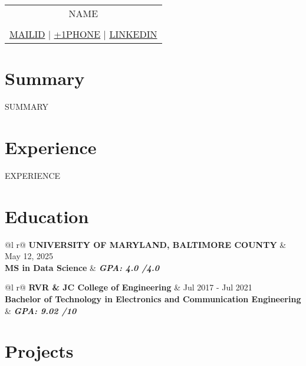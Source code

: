 \documentclass[a4paper,3pt]{article}
\begin{document}
\pagestyle{empty} 


\begin{tabularx}{\linewidth}{@{} C @{}}
\color[HTML]{1C033C} \Huge{{NAME}} \\[0.5pt]
\\
{\href{mailto: {{MAILID}}}{\raisebox{-0.05\height}{\faEnvelope} {{MAILID}}} $|$}
{\href{tel:+1{{PHONE}}}{\raisebox{-0.05\height}{\faMobile} +1{{PHONE}}}  $|$}
{\href{{{LINKEDIN}}}{\raisebox{-0.05\height}{\faLinkedin} {{LINKEDIN}}}}
\end{tabularx}

\section{Summary}
{{SUMMARY}}

\section{Experience}

{{EXPERIENCE}}

\section{Education}
\begin{tabularx}{\linewidth}{ @{}l r@{} }
\color[HTML]{1C033C} \textbf{UNIVERSITY OF MARYLAND,
BALTIMORE COUNTY} & \hfill  May 12, 2025 \\
\textbf{MS in Data Science} & \hfill \textit{\textbf{GPA: 4.0 /4.0}} \\
\end{tabularx}

\begin{tabularx}{\linewidth}{ @{}l r@{} }
 \textbf{RVR \& JC College of Engineering} & \hfill Jul 2017 - Jul 2021 \\
 \textbf{Bachelor of Technology in Electronics and Communication Engineering} & \hfill \textit{\textbf{GPA: 9.02 /10}} \\
\end{tabularx}

\section{Projects}
\end{document}
